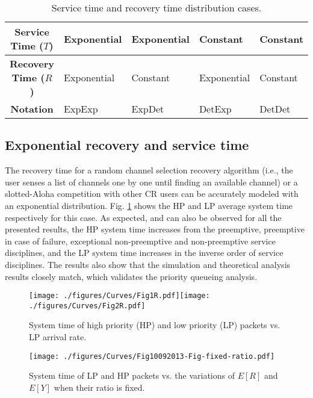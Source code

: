 \documentclass[11pt,journal,oneside,onecolumn,draftclsnofoot]{IEEEtran}
\begin{document}
 \scriptsize
\begin{table}[]
\renewcommand{\arraystretch}{1.3}
\caption{{Service time and recovery time distribution cases.}}
 \label{tab:notations2}
\begin{tabular} {|c|l|l|l|l|}
 \hline
 \hline
\textbf{Service Time ($T$)}&Exponential& Exponential&Constant&Constant\\
 \hline
\textbf{Recovery Time ($R$)}&Exponential& Constant&Exponential&Constant\\
 \hline
\textbf{Notation}&ExpExp& ExpDet&DetExp&DetDet\\
 \hline
\end{tabular}
\normalsize
\end{table}
\normalsize

\subsection{Exponential recovery and service time}
The recovery time for a random channel selection recovery algorithm (i.e., the user senses a list of channels one by one until finding an available channel) or a slotted-Aloha competition with other CR users can be accurately modeled with an exponential distribution. Fig. \ref{fig:32212-33212-D1-EE-LargeSmall} shows the HP and LP average system time respectively for this case.
As expected, and can also be observed for all the presented results, the HP system time increases from the preemptive, preemptive in case of failure, exceptional non-preemptive and non-preemptive service disciplines, and the LP system time increases in the inverse order of service disciplines. The results also show that the simulation and theoretical analysis results closely match, which validates the priority queueing analysis. 
\begin{figure}\texttt{[image: ./figures/Curves/Fig1R.pdf]}\texttt{[image: ./figures/Curves/Fig2R.pdf]}\caption{System time of high priority (HP) and low priority (LP) packets vs. LP arrival rate.}\label{fig:32212-33212-D1-EE-LargeSmall}\end{figure}
\begin{figure}\texttt{[image: ./figures/Curves/Fig10092013-Fig-fixed-ratio.pdf]}\caption{System time of LP and HP packets vs. the variations of $E[R]$ and $E[Y]$ when their ratio is fixed.}\label{fig:Fig-fixed-ratio-10092013.pdf}\end{figure}
\end{document}
